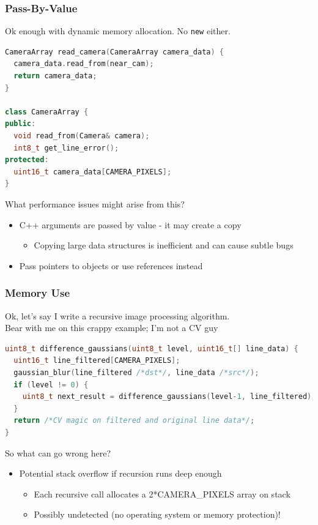 \documentclass{beamer}
\begin{document}
\begin{frame}[fragile]
\frametitle{Pass-By-Value}
Ok enough with dynamic memory allocation. No \texttt{new} either.
\vspace{10px}
\begin{lstlisting}[language=C++,basicstyle=\ttfamily\scriptsize]
CameraArray read_camera(CameraArray camera_data) {
  camera_data.read_from(near_cam);
  return camera_data;
}

class CameraArray {
public:
  void read_from(Camera& camera);
  int8_t get_line_error();
protected:
  uint16_t camera_data[CAMERA_PIXELS];
}
\end{lstlisting}
\vspace{10px}
What performance issues might arise from this?
\begin{itemize}
  \item<2> C++ arguments are passed by value - it may create a copy
  \begin{itemize}
    \item Copying large data structures is inefficient and can cause subtle bugs
  \end{itemize}
  \item<2> Pass pointers to objects or use references instead
\end{itemize}
\end{frame}

\begin{frame}[fragile]
\frametitle{Memory Use}
Ok, let's say I write a recursive image processing algorithm. \\
{\scriptsize Bear with me on this crappy example; I'm not a CV guy}
\vspace{10px}
\begin{lstlisting}[language=C++,basicstyle=\ttfamily\scriptsize]
uint8_t difference_gaussians(uint8_t level, uint16_t[] line_data) {
  uint16_t line_filtered[CAMERA_PIXELS];
  gaussian_blur(line_filtered /*dst*/, line_data /*src*/);
  if (level != 0) {
    uint8_t next_result = difference_gaussians(level-1, line_filtered);
  }
  return /*CV magic on filtered and original line data*/;
}
\end{lstlisting}
\vspace{10px}
So what can go wrong here?
\begin{itemize}
  \item<2> Potential stack overflow if recursion runs deep enough
  \begin{itemize}
    \item Each recursive call allocates a 2*CAMERA\_PIXELS array on stack
    \item Possibly undetected (no operating system or memory protection)!
  \end{itemize}
\end{itemize}
\end{frame}
\end{document}
